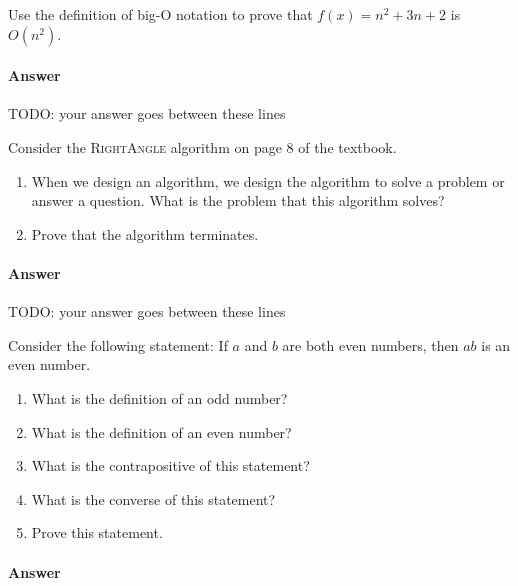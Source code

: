 \documentclass{article}
\begin{document}



\nextprob
Use the definition of big-O notation to prove that $f(x)=n^2 + 3n +2$ is
$O(n^2)$.

\paragraph{Answer}


TODO: your answer goes between these lines




\nextprob
Consider the \textsc{RightAngle} algorithm on page 8 of the textbook.
\begin{enumerate}
    \item When we design an algorithm, we design the algorithm to solve a
        problem or answer a question.  What is the problem that this algorithm
        solves?
    \item Prove that the algorithm terminates.
\end{enumerate}

\paragraph{Answer}


TODO: your answer goes between these lines




\nextprob
Consider the following statement: If $a$ and $b$ are both even numbers, then $ab$ is
an even number.
\begin{enumerate}
    \item What is the definition of an odd number?
    \item What is the definition of an even number?
    \item What is the contrapositive of this statement?
    \item What is the converse of this statement?
    \item Prove this statement.
\end{enumerate}

\paragraph{Answer}
\end{document}
